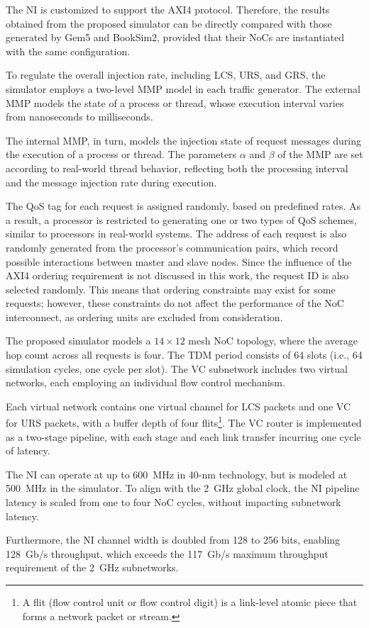 The \ac{NI} is customized to support the AXI4 protocol. Therefore, the results obtained from the proposed simulator can be directly compared with those generated by Gem5 and BookSim2, provided that their NoCs are instantiated with the same configuration.

To regulate the overall injection rate, including \ac{LCS}, \ac{URS}, and \ac{GRS}, the simulator employs a two-level \ac{MMP} model in each traffic generator. The external MMP models the state of a process or thread, whose execution interval varies from nanoseconds to milliseconds. 

The internal MMP, in turn, models the injection state of request messages during the execution of a process or thread. The parameters $\alpha$ and $\beta$ of the MMP are set according to real-world thread behavior, reflecting both the processing interval and the message injection rate during execution. 

The QoS tag for each request is assigned randomly, based on predefined rates. As a result, a processor is restricted to generating one or two types of QoS schemes, similar to processors in real-world systems. 
The address of each request is also randomly generated from the processor’s communication pairs, which record possible interactions between master and slave nodes. 
Since the influence of the AXI4 ordering requirement is not discussed in this work, the request ID is also selected randomly. This means that ordering constraints may exist for some requests; however, these constraints do not affect the performance of the NoC interconnect, as ordering units are excluded from consideration.

The proposed simulator models a $14 \times 12$ mesh NoC topology, where the average hop count across all requests is four. The TDM period consists of 64 slots (i.e., 64 simulation cycles, one cycle per slot). The VC subnetwork includes two virtual networks, each employing an individual flow control mechanism.

Each virtual network contains one virtual channel for LCS packets and one VC for URS packets, with a buffer depth of four flits\footnote{A flit (flow control unit or flow control digit) is a link-level atomic piece that forms a network packet or stream.}. The VC router is implemented as a two-stage pipeline, with each stage and each link transfer incurring one cycle of latency. 

The NI can operate at up to 600~MHz in 40-nm technology, but is modeled at 500~MHz in the simulator. To align with the 2~GHz global clock, the NI pipeline latency is scaled from one to four NoC cycles, without impacting subnetwork latency. 

Furthermore, the NI channel width is doubled from 128 to 256 bits, enabling 128~Gb/s throughput, which exceeds the 117~Gb/s maximum throughput requirement of the 2~GHz subnetworks.
